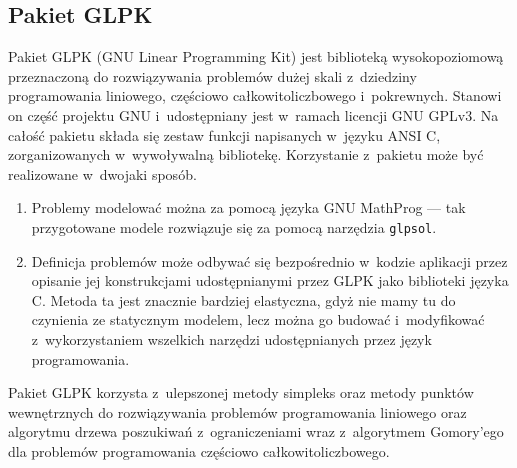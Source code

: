 \subsection{Pakiet GLPK} %
\label{ss_internals_glpk}
\par{
  Pakiet GLPK (GNU Linear Programming Kit) jest biblioteką wysokopoziomową przeznaczoną do rozwiązywania problemów dużej skali z~dziedziny programowania liniowego, częściowo całkowitoliczbowego i~pokrewnych.
  Stanowi on część projektu GNU i~udostępniany jest w~ramach licencji GNU GPLv3.
  Na całość pakietu składa się zestaw funkcji napisanych w~języku ANSI C, zorganizowanych w~wywoływalną bibliotekę.
  Korzystanie z~pakietu może być realizowane w~dwojaki sposób.
  \begin{enumerate}
    \item Problemy modelować można za pomocą języka GNU MathProg --- tak przygotowane modele rozwiązuje się za pomocą narzędzia \texttt{glpsol}.
    \item Definicja problemów może odbywać się bezpośrednio w~kodzie aplikacji przez opisanie jej konstrukcjami udostępnianymi przez GLPK jako biblioteki języka C. Metoda ta jest znacznie bardziej elastyczna, gdyż nie mamy tu do czynienia ze statycznym modelem, lecz można go budować i~modyfikować z~wykorzystaniem wszelkich narzędzi udostępnianych przez język programowania.
  \end{enumerate}
}
\par{
  Pakiet GLPK korzysta z~ulepszonej metody simpleks oraz metody punktów wewnętrznych do rozwiązywania problemów programowania liniowego oraz algorytmu drzewa poszukiwań z~ograniczeniami wraz z~algorytmem Gomory'ego dla problemów programowania częściowo całkowitoliczbowego.
}
